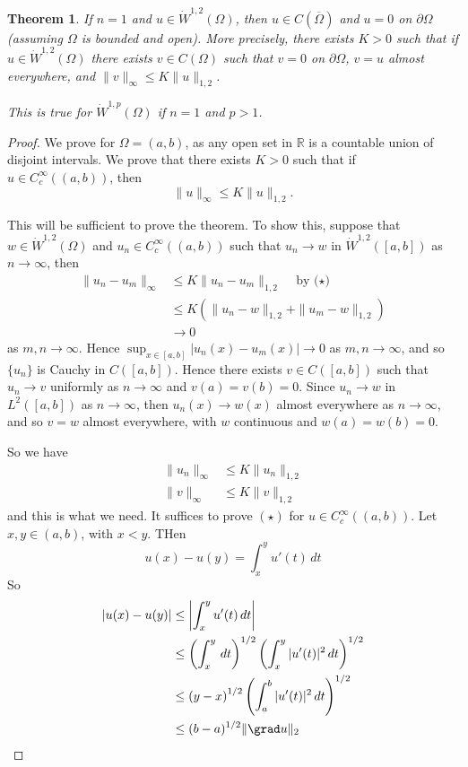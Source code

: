 \documentclass[10pt, oneside, reqno]{amsart}
\theoremstyle{plain}%
\newtheorem{thm}{Theorem}[section]
\numberwithin{equation}{section}
\theoremstyle{definition}
\theoremstyle{remark}
\newcommand{\R}{\mathbb{R}}
\begin{document}
\begin{thm}
    \label{thm:his_thm_7.2}
    If $n = 1$ and $u \in \dot W^{1, 2}(\Omega)$, then $u \in C(\overline \Omega)$ and $u = 0$ on $\partial \Omega$ (assuming $\Omega$ is bounded and open).  More precisely, there exists $K > 0$ such that if $u \in \dot W^{1, 2}(\Omega)$ there exists $v \in C(\Omega)$ such that $v = 0$ on $\partial \Omega$, $v = u$ almost everywhere, and $\| v \|_\infty \leq K \| u \|_{1, 2}$.  
    
    This is true for $\dot W^{1, p}(\Omega)$ if $n = 1$ and $p > 1$.
\end{thm}

\begin{proof}
    We prove for $\Omega = (a, b)$, as any open set in $\R$ is a countable union of disjoint intervals.  We prove that there exists $K > 0$ such that if $u \in C^\infty_c((a, b))$, then 
    \[
        \| u \|_\infty \leq K \| u \|_{1, 2}.
        \tag{$\star$}
    \]  
    
    This will be sufficient to prove the theorem.  To show this, suppose that $w \in \dot W^{1, 2}(\Omega)$ and $u_n \in C^\infty_c((a,b))$ such that $u_n \rightarrow w$ in $\dot W^{1, 2}([a,b])$ as $n \rightarrow \infty$, then \begin{align*}
        \| u_n - u_m \|_\infty &\leq K \| u_n - u_m \|_{1, 2} \quad \text{by ($\star$)}\\
        &\leq K \left( \| u_n - w \|_{1, 2} + \| u_m - w \|_{1, 2} \right) \\
        &\rightarrow 0 
    \end{align*} as $m, n \rightarrow \infty$.  Hence $\sup_{x \in [a, b]} |u_n(x) - u_m(x)| \rightarrow 0$ as $m, n \rightarrow \infty$, and so $\{ u_n \}$ is Cauchy in $C([a, b])$.  Hence there exists $v \in C([a, b])$ such that $u_n \rightarrow v$ uniformly as $n \rightarrow \infty$ and $v(a) = v(b) = 0$.  Since $u_n \rightarrow w$ in $L^2([a,b])$ as $n \rightarrow \infty$, then $u_n(x) \rightarrow w(x)$ almost everywhere as $n \rightarrow \infty$, and so $v = w$ almost everywhere, with $w$ continuous and $w(a) = w(b) = 0$. 
    
    So we have \begin{align*}
        \| u_n \|_\infty &\leq K \| u_n \|_{1, 2} \\
        \| v \|_\infty &\leq K \| v \|_{1, 2}
    \end{align*} and this is what we need.  It suffices to prove $(\star)$ for $u \in C^\infty_c((a,b))$.  Let $x, y \in (a, b)$, with $x < y$.  THen \[
        u(x) - u(y) = \int_x^y u'(t) \, dt
    \]  So \begin{align*}
        |u(x) - u(y) | &\leq \left| \int_x^y u'(t) \, dt \right| \\
        &\leq \left( \int_x^y \, dt \right)^{1/2} \left( \int_x^y |u'(t)|^2 \, dt \right)^{1/2} \\
        &\leq \left(y-x\right)^{1/2} \left( \int_a^b |u'(t)|^2 \, dt \right)^{1/2} \\
        &\leq (b-a)^{1/2} \| \grad u \|_2
    \end{align*} 
\end{proof}
\end{document}

